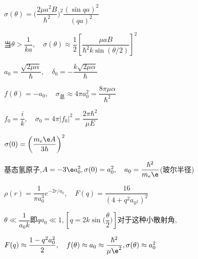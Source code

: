 		$ \sigma(\theta)=\bigg(\dfrac{2\mu a^{2}B}{\hbar^{2}}\bigg)^{2}\dfrac{(\sin qa)^{2}}{(qa)^{2}} $
		
		当$ \theta>\dfrac{1}{ka},\quad \sigma(\theta)\approx\dfrac{1}{2}\left[\dfrac{\mu aB}{\hbar^{2}k\sin(\theta/2)}\right]^{2} $

\answer $ a_{0}=\dfrac{\sqrt{2\mu\alpha}}{\hbar},\quad \delta_{0}=-\dfrac{k\sqrt{2\mu\alpha}}{\hbar} $

		$ f(\theta)=-a_{0},\quad \sigma_{\text{总}}\approx 4\pi a_{0}^{2}=\dfrac{8\pi\mu\alpha}{\hbar^{2}} $

\answer $ f_{0}=\dfrac{i}{k},\quad \sigma_{0}=4\pi|f_{0}|^{2}=\dfrac{2\pi\hbar^{2}}{\mu E} $

\answer $ \sigma(0)=\bigg(\dfrac{m_{e}\e A}{3\hbar}\bigg)^{2} $

		基态氢原子,$ A=-3\e a_{0}^{2},\sigma(0)=a_{0}^{2},\quad a_{0}=\dfrac{\hbar^{2}}{m_{e}\e} $(玻尔半径)

\answer $ \rho(r)=\dfrac{1}{\pi a_{0}^{3}}e^{-2r/a_{0}},\quad F(q)=\dfrac{16}{(4+q^{2}a_{0^{2}})^{2}} $

		$ \theta\ll\dfrac{1}{a_{0}k}$即$ qa_{0}\ll 1,\left[q=2k\sin\bigg(\dfrac{\theta}{2}\bigg)\right]$对于这种小散射角,
		
		$ F(q)\approx \dfrac{1-q^{2}a_{0}^{2}}{2},\quad f(\theta)\approx a_{0}\approx\dfrac{\hbar^{2}}{\mu \e^{2}},\sigma(\theta)\approx a_{0}^{2} $